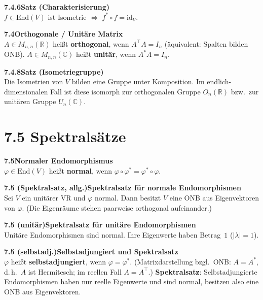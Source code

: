 \documentclass[a4paper,12pt]{article}
\newcommand{\gentry}[3]{%
  \noindent\textbf{#1\quad #2}\nopagebreak\\[0.2em]
  #3\par\smallskip
}
\begin{document}
\gentry{7.4.6}{Satz (Charakterisierung)}{%
  $f \in \mathrm{End}(V)$ ist Isometrie $\iff$ $f^* \circ f = \mathrm{id}_V$.
}

\gentry{7.4}{Orthogonale / Unitäre Matrix}{%
  $A \in M_{n,n}(\mathbb{R})$ heißt \textbf{orthogonal}, wenn $A^\top A = I_n$ (äquivalent: Spalten bilden ONB).
  $A \in M_{n,n}(\mathbb{C})$ heißt \textbf{unitär}, wenn $A^* A = I_n$.
}

\gentry{7.4.8}{Satz (Isometriegruppe)}{%
  Die Isometrien von $V$ bilden eine Gruppe unter Komposition.
  Im endlich-dimensionalen Fall ist diese isomorph zur orthogonalen Gruppe $O_n(\mathbb{R})$ bzw.\ zur unitären Gruppe $U_n(\mathbb{C})$.
}

\section*{7.5 \quad Spektralsätze}

\gentry{7.5}{Normaler Endomorphismus}{%
  $\varphi \in \mathrm{End}(V)$ heißt \textbf{normal}, wenn $\varphi \circ \varphi^* = \varphi^* \circ \varphi$.
}

\gentry{7.5 (Spektralsatz, allg.)}{Spektralsatz für normale Endomorphismen}{%
  Sei $V$ ein unitärer VR und $\varphi$ normal. Dann besitzt $V$ eine ONB aus Eigenvektoren von $\varphi$.
  (Die Eigenräume stehen paarweise orthogonal aufeinander.)
}

\gentry{7.5 (unitär)}{Spektralsatz für unitäre Endomorphismen}{%
  Unitäre Endomorphismen sind normal. Ihre Eigenwerte haben Betrag~$1$ ($|\lambda| = 1$).
}

\gentry{7.5 (selbstadj.)}{Selbstadjungiert und Spektralsatz}{%
  $\varphi$ heißt \textbf{selbstadjungiert}, wenn $\varphi = \varphi^*$.
  (Matrixdarstellung bzgl.\ ONB: $A = A^*$, d.\,h.\ $A$ ist Hermitesch; im reellen Fall $A = A^\top$.)
  \textbf{Spektralsatz}: Selbstadjungierte Endomorphismen haben nur reelle Eigenwerte und sind normal, besitzen also eine ONB aus Eigenvektoren.
}
\end{document}
